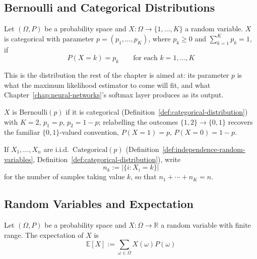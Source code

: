 	\subsection{Bernoulli and Categorical Distributions}
		
		\begin{definition}
			\label{def:categorical-distribution}
			Let $(\Omega, P)$ be a probability space and $X:\Omega\to\{1,\dots,K\}$ a random variable. $X$ is categorical with parameter $p=(p_1,\dots,p_K)$, where $p_k\ge0$ and $\sum_{k=1}^K p_k=1$, if
			\[
				P(X=k) = p_k \qquad \text{for each } k=1,\dots,K
			\]
		\end{definition}
		
		\begin{remark}
			\label{rem:categorical-mle-softmax}
			This is the distribution the rest of the chapter is aimed at: its parameter $p$ is what the maximum likelihood estimator to come will fit, and what Chapter~\ref{chap:neural-networks}'s softmax layer produces as its output.
		\end{remark}
		
		\begin{remark}
			\label{rem:bernoulli-distribution}
			$X$ is Bernoulli$(p)$ if it is categorical (Definition~\ref{def:categorical-distribution}) with $K=2$, $p_1=p$, $p_2=1-p$; relabelling the outcomes $\{1,2\}\to\{0,1\}$ recovers the familiar $\{0,1\}$-valued convention, $P(X=1)=p$, $P(X=0)=1-p$.
		\end{remark}
		
		\begin{remark}
			\label{rem:iid-sample-counts}
			If $X_1,\dots,X_n$ are i.i.d.\ $\mathrm{Categorical}(p)$ (Definition~\ref{def:independence-random-variables}, Definition~\ref{def:categorical-distribution}), write
			\[
				n_k := |\{i : X_i=k\}|
			\]
			for the number of samples taking value $k$, so that $n_1+\cdots+n_K=n$.
		\end{remark}
		
	\subsection{Random Variables and Expectation}
		
		\begin{definition}[Expectation]
			\label{def:expectation}
			Let $(\Omega, P)$ be a probability space and $X:\Omega\to\mathbb{R}$ a random variable with finite range. The expectation of $X$ is
			\[
				\mathbb{E}[X] := \sum_{\omega\in\Omega} X(\omega)P(\omega)
			\]
		\end{definition}
		
